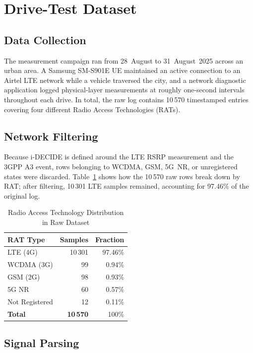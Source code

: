 \documentclass[journal]{IEEEtran}
\begin{document}
\section{Drive-Test Dataset}
\label{sec:dataset}

\subsection{Data Collection}

The measurement campaign ran from 28~August to 31~August~2025 across an
urban area. A Samsung SM-S901E UE maintained an active connection to an
Airtel LTE network while a vehicle traversed the city, and a network
diagnostic application logged physical-layer measurements at roughly
one-second intervals throughout each drive. In total, the raw log
contains 10\,570 timestamped entries covering four different Radio
Access Technologies (RATs).

\subsection{Network Filtering}

Because i-DECIDE is defined around the LTE RSRP measurement and the
3GPP A3 event, rows belonging to WCDMA, GSM, 5G~NR, or unregistered
states were discarded. Table~\ref{tab:rat} shows how the 10\,570 raw
rows break down by RAT; after filtering, 10\,301 LTE samples remained,
accounting for 97.46\% of the original log.

\begin{table}[!t]
\caption{Radio Access Technology Distribution in Raw Dataset}
\label{tab:rat}
\centering
\begin{tabular}{lrr}
\toprule
\textbf{RAT Type} & \textbf{Samples} & \textbf{Fraction} \\
\midrule
LTE (4G)       & 10\,301 & 97.46\% \\
WCDMA (3G)     &      99 &  0.94\% \\
GSM (2G)       &      98 &  0.93\% \\
5G NR          &      60 &  0.57\% \\
Not Registered &      12 &  0.11\% \\
\midrule
\textbf{Total} & \textbf{10\,570} & 100\% \\
\bottomrule
\end{tabular}
\end{table}

\subsection{Signal Parsing}
\end{document}
